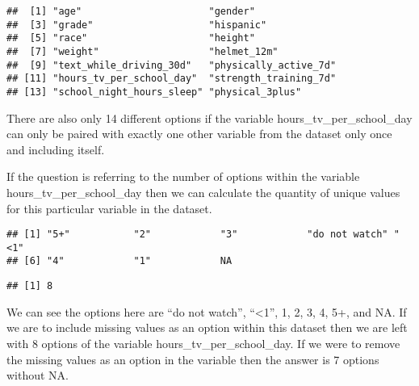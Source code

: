 \documentclass[
]{article}
\newenvironment{Shaded}{\begin{snugshade}}{\end{snugshade}}
\newcommand{\KeywordTok}[1]{\textcolor[rgb]{0.13,0.29,0.53}{\textbf{#1}}}
\newcommand{\NormalTok}[1]{#1}
\newcommand{\OperatorTok}[1]{\textcolor[rgb]{0.81,0.36,0.00}{\textbf{#1}}}
\begin{document}
\begin{verbatim}
##  [1] "age"                      "gender"                  
##  [3] "grade"                    "hispanic"                
##  [5] "race"                     "height"                  
##  [7] "weight"                   "helmet_12m"              
##  [9] "text_while_driving_30d"   "physically_active_7d"    
## [11] "hours_tv_per_school_day"  "strength_training_7d"    
## [13] "school_night_hours_sleep" "physical_3plus"
\end{verbatim}

There are also only 14 different options if the variable
hours\_tv\_per\_school\_day can only be paired with exactly one other
variable from the dataset only once and including itself.

If the question is referring to the number of options within the
variable hours\_tv\_per\_school\_day then we can calculate the quantity
of unique values for this particular variable in the dataset.

\begin{Shaded}
\end{Shaded}

\begin{verbatim}
## [1] "5+"           "2"            "3"            "do not watch" "<1"          
## [6] "4"            "1"            NA
\end{verbatim}

\begin{Shaded}
\end{Shaded}

\begin{verbatim}
## [1] 8
\end{verbatim}

We can see the options here are ``do not watch'', ``\textless1'', 1, 2,
3, 4, 5+, and NA. If we are to include missing values as an option
within this dataset then we are left with 8 options of the variable
hours\_tv\_per\_school\_day. If we were to remove the missing values as
an option in the variable then the answer is 7 options without NA.
\end{document}
